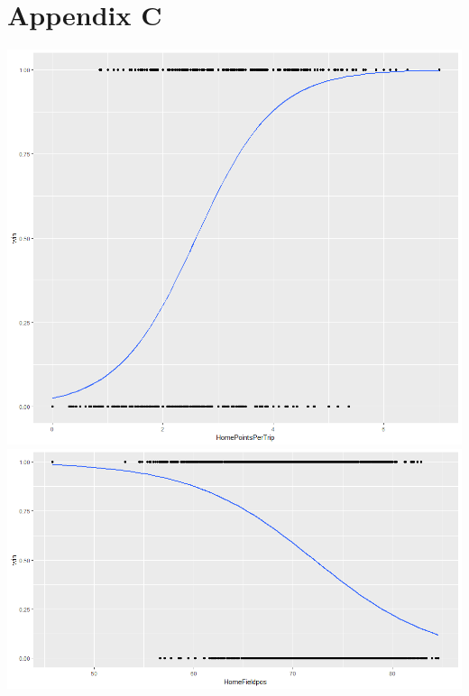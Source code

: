 \documentclass[12pt,english]{article}
\begin{document}
\section{Appendix C}
\includegraphics[scale=.5]{PPT.png}
\\
\includegraphics[scale=.5]{Field Pos.png}
\end{document}
